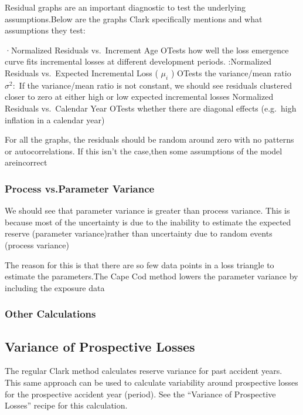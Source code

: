\documentclass[
]{article}
\begin{document}
Residual graphs are an important diagnostic to test the underlying
assumptions.Below are the graphs Clark specifically mentions and what
assumptions they test:

·Normalized Residuals vs.~Increment Age OTests how well the loss
emergence curve fits incremental losses at different development
periods. :Normalized Residuals vs.~Expected Incremental Loss (
\(\mu_{i}\) ) OTests the variance/mean ratio \(\sigma^{2}\colon\) If the
variance/mean ratio is not constant, we should see residuals clustered
closer to zero at either high or low expected incremental losses
Normalized Residuals vs.~Calendar Year OTests whether there are diagonal
effects (e.g.~high inflation in a calendar year)

For all the graphs, the residuals should be random around zero with no
patterns or autocorrelations. If this isn't the case,then some
assumptions of the model areincorrect

\subsubsection{Process vs.Parameter
Variance}\label{process-vs.parameter-variance}

We should see that parameter variance is greater than process variance.
This is because most of the uncertainty is due to the inability to
estimate the expected reserve (parameter variance)rather than
uncertainty due to random events (process variance)

The reason for this is that there are so few data points in a loss
triangle to estimate the parameters.The Cape Cod method lowers the
parameter variance by including the exposure data

\subsubsection{Other Calculations}\label{other-calculations}

\subsection{Variance of Prospective
Losses}\label{variance-of-prospective-losses}

The regular Clark method calculates reserve variance for past accident
years. This same approach can be used to calculate variability around
prospective losses for the prospective accident year (period). See the
``Variance of Prospective Losses'' recipe for this calculation.
\end{document}
